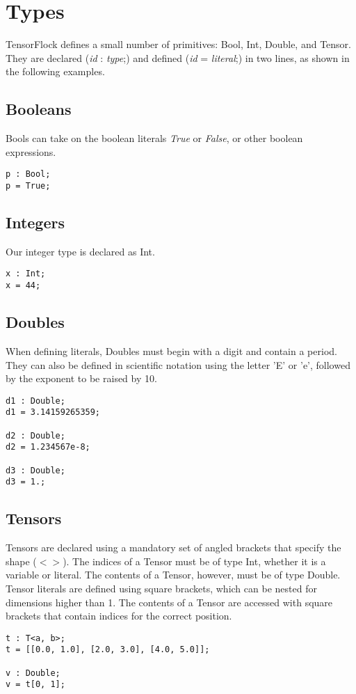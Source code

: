 \section{Types}%
\label{sec:types}

TensorFlock defines a small number of primitives: Bool, Int, Double, and Tensor. They are declared (\emph{id} : \emph{type};) and defined (\emph{id} = \emph{literal};) in two lines, as shown in the following examples. 

\subsection{Booleans}
Bools can take on the boolean literals \emph{True} or \emph{False}, or other boolean expressions.
\begin{lstlisting}
p : Bool;
p = True;
\end{lstlisting}

\subsection{Integers}
Our integer type is declared as Int.
\begin{lstlisting}
x : Int;
x = 44;
\end{lstlisting}

\subsection{Doubles}
When defining literals, Doubles must begin with a digit and contain a period. They can also be defined in scientific notation using the letter 'E' or 'e', followed by the exponent to be raised by 10. 
\begin{lstlisting}
d1 : Double;
d1 = 3.14159265359;

d2 : Double;
d2 = 1.234567e-8;

d3 : Double;
d3 = 1.;
\end{lstlisting}

\subsection{Tensors}
Tensors are declared using a mandatory set of angled brackets that specify the shape ($< >$). The indices of a Tensor must be of type Int, whether it is a variable or literal. The contents of a Tensor, however, must be of type Double. \\
Tensor literals are defined using square brackets, which can be nested for dimensions higher than 1. The contents of a Tensor are accessed with square brackets that contain indices for the correct position. 
\begin{lstlisting}
t : T<a, b>;
t = [[0.0, 1.0], [2.0, 3.0], [4.0, 5.0]];

v : Double;
v = t[0, 1];
\end{lstlisting}


